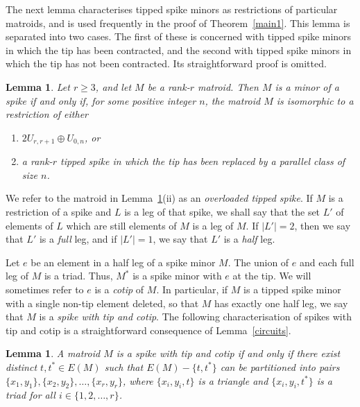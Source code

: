\documentclass[11pt]{amsart}
\newtheorem{lemma}[theorem]{Lemma}
\numberwithin{equation}{section} %
\begin{document}
The next lemma characterises tipped spike minors as restrictions of particular matroids, and is used frequently in the proof of Theorem~\ref{main1}. This lemma is separated into two cases. The first of these is concerned with tipped spike minors in which the tip has been contracted, and the second with tipped spike minors in which the tip has not been contracted. Its straightforward proof is omitted.

\begin{lemma}
\label{lemma: spike degeneracy}
Let $r\ge 3$, and let $M$ be a rank-$r$ matroid. Then $M$ is a minor of a spike if and only if, for some positive integer $n$, the matroid $M$ is isomorphic to a restriction of either
\begin{enumerate}[{\rm (i)}]
\item $2U_{r, r+1}\oplus U_{0, n}$, or

\item a rank-$r$ tipped spike in which the tip has been replaced by a parallel class of size $n$.
\end{enumerate}
\end{lemma}

\noindent We refer to the matroid in Lemma~\ref{lemma: spike degeneracy}(ii) as an {\em overloaded tipped spike}. If $M$ is a restriction of a spike and $L$ is a leg of that spike, we shall say that the set $L'$ of elements of $L$ which are still elements of $M$ is a leg of $M$. If $|L'| = 2$, then we say that $L'$ is a {\em full} leg, and if $|L'| = 1$, we say that $L'$ is a {\em half} leg.

Let $e$ be an element in a half leg of a spike minor $M$. The union of $e$ and each full leg of $M$ is a triad. Thus, $M^*$ is a spike minor with $e$ at the tip. We will sometimes refer to $e$ is a {\em cotip} of $M$. In particular, if $M$ is a tipped spike minor with a single non-tip element deleted, so that $M$ has exactly one half leg, we say that $M$ is a {\em spike with tip and cotip}. The following characterisation of spikes with tip and cotip is a straightforward consequence of Lemma~\ref{circuits}.

\begin{lemma}
A matroid $M$ is a spike with tip and cotip if and only if there exist distinct $t, t^* \in E(M)$ such that $E(M) - \{t,t^*\}$ can be partitioned into pairs $\{x_1,y_1\},\{x_2,y_2\},\ldots,\{x_r,y_r\}$, where $\{x_i,y_i,t\}$ is a triangle and $\{x_i,y_i,t^*\}$ is a triad for all $i \in \{1,2,\ldots,r\}$.
\label{lem: tip_and_cotip}
\end{lemma}
\end{document}
